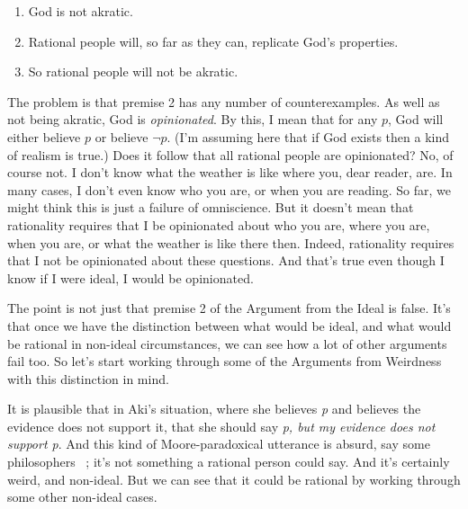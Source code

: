 \begin{enumerate}
\item{} God is not akratic.

\item{} Rational people will, so far as they can, replicate God's properties.

\item{} So rational people will not be akratic.

\end{enumerate}
The problem is that premise 2 has any number of counterexamples. As well as not being akratic, God is \emph{opinionated}. By this, I mean that for any $p$, God will either believe $p$ or believe $\neg p$. (I'm assuming here that if God exists then a kind of realism is true.) Does it follow that all rational people are opinionated? No, of course not. I don't know what the weather is like where you, dear reader, are. In many cases, I don't even know who you are, or when you are reading. So far, we might think this is just a failure of omniscience. But it doesn't mean that rationality requires that I be opinionated about who you are, where you are, when you are, or what the weather is like there then. Indeed, rationality requires that I not be opinionated about these questions. And that's true even though I know if I were ideal, I would be opinionated.

The point is not just that premise 2 of the Argument from the Ideal is false. It's that once we have the distinction between what would be ideal, and what would be rational in non-ideal circumstances, we can see how a lot of other arguments fail too. So let's start working through some of the Arguments from Weirdness with this distinction in mind.

It is plausible that in \gls{Aki}'s situation, where she believes \emph{p} and believes the evidence does not support it, that she should say \emph{p, but my evidence does not support p}. And this kind of Moore-paradoxical utterance is absurd, say some philosophers ~\citep{Smithies2012, Greco2014}; it's not something a rational person could say. And it's certainly weird, and non-ideal. But we can see that it could be rational by working through some other non-ideal cases.

